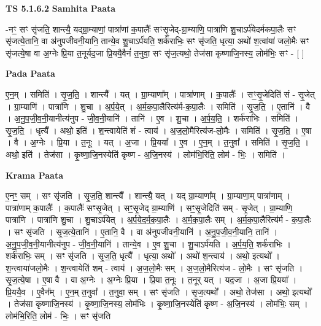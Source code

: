 \documentclass[17pt]{extarticle}
\begin{document}
\textbf{TS 5.1.6.2 } \newline
\textbf{Samhita Paata} \newline

-नꣳ॒॒ सꣳ सृ॑जति॒ शान्त्यै॒ यद्ग्रा॒म्याणां॒ पात्रा॑णां क॒पालैः᳚ सꣳसृ॒जेद्-ग्रा॒म्याणि॒ पात्रा॑णि शु॒चाऽर्प॑येदर्मकपा॒लैः सꣳ सृ॑जत्ये॒तानि॒ वा अ॑नुपजीवनी॒यानि॒ तान्ये॒व शु॒चाऽर्प॑यति॒ शर्क॑राभिः॒ सꣳ सृ॑जति॒ धृत्या॒ अथो॑ श॒त्वांया॑ जलो॒मैः सꣳ सृ॑जत्ये॒षा वा अ॒ग्नेः प्रि॒या त॒नूर्यद॒जा प्रि॒ययै॒वैनं॑ त॒नुवा॒ सꣳ सृ॑ज॒त्यथो॒ तेज॑सा कृष्णाजि॒नस्य॒ लोम॑भिः॒ सꣳ - [  ] \newline

\textbf{Pada Paata} \newline

ए॒न॒म् । समिति॑ । सृ॒ज॒ति॒ । शान्त्यै᳚ । यत् । ग्रा॒म्याणा᳚म् । पात्रा॑णाम् । क॒पालैः᳚ । सꣳ॒॒सृ॒जेदिति॑ सं - सृ॒जेत् । ग्रा॒म्याणि॑ । पात्रा॑णि । शु॒चा । अ॒र्प॒ये॒त् । अ॒र्म॒क॒पा॒लैरित्य॑र्म-क॒पा॒लैः । समिति॑ । सृ॒ज॒ति॒ । ए॒तानि॑ । वै । अ॒नु॒प॒जी॒व॒नी॒यानीत्य॑नुप - जी॒व॒नी॒यानि॑ । तानि॑ । ए॒व । शु॒चा । अ॒र्प॒य॒ति॒ । शर्क॑राभिः । समिति॑ । सृ॒ज॒ति॒ । धृत्यै᳚ । अथो॒ इति॑ । श॒न्त्वायेति॑ शं - त्वाय॑ । अ॒ज॒लो॒मैरित्य॑ज-लो॒मैः । समिति॑ । सृ॒ज॒ति॒ । ए॒षा । वै । अ॒ग्नेः । प्रि॒या । त॒नूः । यत् । अ॒जा । प्रि॒यया᳚ । ए॒व । ए॒न॒म् । त॒नुवा᳚ । समिति॑ । सृ॒ज॒ति॒ । अथो॒ इति॑ । तेज॑सा । कृ॒ष्णा॒जि॒नस्येति॑ कृष्ण - अ॒जि॒नस्य॑ । लोम॑भि॒रिति॒ लोम॑ - भिः॒ । समिति॑ ।  \newline


\textbf{Krama Paata} \newline

ए॒नꣳ॒॒ सम् । सꣳ सृ॑जति । सृ॒ज॒ति॒ शान्त्यै᳚ । शान्त्यै॒ यत् । यद् ग्रा॒म्याणा᳚म् । ग्रा॒म्याणा॒म् पात्रा॑णाम् । पात्रा॑णाम् क॒पालैः᳚ । क॒पालैः᳚ सꣳसृ॒जेत् । सꣳ॒॒सृ॒जेद् ग्रा॒म्याणि॑ । सꣳ॒॒सृ॒जेदिति॑ सम् - सृ॒जेत् । ग्रा॒म्याणि॒ पात्रा॑णि । पात्रा॑णि शु॒चा । शु॒चाऽर्प॑येत् । अ॒र्प॒ये॒द॒र्म॒क॒पा॒लैः । अ॒र्म॒क॒पा॒लैः सम् । अ॒र्म॒क॒पा॒लैरित्य॑र्म - क॒पा॒लैः । सꣳ सृ॑जति । सृ॒ज॒त्ये॒तानि॑ । ए॒तानि॒ वै । वा अ॑नुपजीवनी॒यानि॑ । अ॒नु॒प॒जी॒व॒नी॒यानि॒ तानि॑ । अ॒नु॒प॒जी॒व॒नी॒यानीत्य॑नुप - जी॒व॒नी॒यानि॑ । तान्ये॒व । ए॒व शु॒चा । शु॒चाऽर्प॑यति । अ॒र्प॒य॒ति॒ शर्क॑राभिः । शर्क॑राभिः॒ सम् । सꣳ सृ॑जति । सृ॒ज॒ति॒ धृत्यै᳚ । धृत्या॒ अथो᳚ । अथो॑ श॒न्त्वाय॑ । अथो॒ इत्यथो᳚ । श॒न्त्वाया॑जलो॒मैः । श॒न्त्वायेति॑ शम् - त्वाय॑ । अ॒ज॒लो॒मैः सम् । अ॒ज॒लो॒मैरित्य॑ज - लो॒मैः । सꣳ सृ॑जति । सृ॒ज॒त्ये॒षा । ए॒षा वै । वा अ॒ग्नेः । अ॒ग्नेः प्रि॒या । प्रि॒या त॒नूः । त॒नूर् यत् । यद॒जा । अ॒जा प्रि॒यया᳚ । प्रि॒ययै॒व । ए॒वैन᳚म् । ए॒न॒म् त॒नुवा᳚ । त॒नुवा॒ सम् । सꣳ सृ॑जति । सृ॒ज॒त्यथो᳚ । अथो॒ तेज॑सा । अथो॒ इत्यथो᳚ । तेज॑सा कृष्णाजि॒नस्य॑ । कृ॒ष्णा॒जि॒नस्य॒ लोम॑भिः । कृ॒ष्णा॒जि॒नस्येति॑ कृष्ण - अ॒जि॒नस्य॑ । लोम॑भिः॒ सम् । लोम॑भि॒रिति॒ लोम॑ - भिः॒ । सꣳ सृ॑जति \newline
\end{document}
